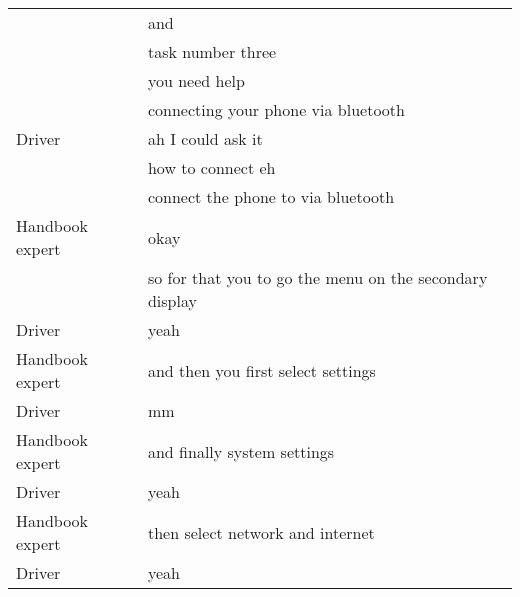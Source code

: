 \begin{table}[H]
\begin{tabular}{p{3cm}p{8cm}}
 & and                                                                                                                   \\
 & task number three                                                                                                     \\
 & you need help                                                                                                         \\
 & connecting your phone via bluetooth                                                                                   \\
Driver          & ah I could ask it                                                                                                     \\
          & how to connect eh                                                                                                     \\
          & connect the phone to via bluetooth                                                                                    \\
Handbook expert & okay                                                                                                                  \\
 & so for that you to go the menu on the secondary display                                                               \\
Driver          & yeah                                                                                                                  \\
Handbook expert & and then you first select settings                                                                                    \\
Driver          & mm                                                                                                                    \\
Handbook expert & and finally system settings                                                                                           \\
Driver          & yeah                                                                                                                  \\
Handbook expert & then select network and internet                                                                                      \\
Driver          & yeah                                                                                                                  \\

\end{tabular}
\end{table}
